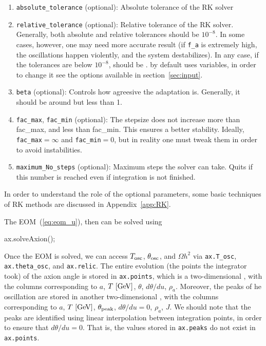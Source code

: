 \documentclass[11pt,a4paper]{article}
\begin{document}
\begin{enumerate}
	\item {\tt absolute\_tolerance} (optional): Absolute tolerance of the RK solver
	
	\item {\tt relative\_tolerance} (optional): Relative tolerance of the RK solver.
	Generally, both absolute and relative tolerances should be $10^{-8}$. 
	In some cases, however, one may need more accurate result (\eg if {\tt f\_a} is extremely high, 
	the oscillations happen violently, and the system destabilizes). In any case, if the  
	tolerances are below $10^{-8}$,  should be . \mimes by default uses  variables, 
	in order to change it see the options available in section~\ref{sec:input}.
	
	\item {\tt beta} (optional): Controls how agreesive the adaptation is. Generally, it should be around but less than 1.
	
	\item {\tt fac\_max},  {\tt fac\_min} (optional): The stepsize does not increase more than fac\_max, and less than fac\_min. 
	This ensures a better stability. Ideally, {\tt fac\_max}$=\infty$ and {\tt fac\_min}$=0$, but in reality one must 
	tweak them in order to avoid instabilities.
	
	\item {\tt maximum\_No\_steps} (optional): Maximum steps the solver can take. Quits if this number is reached even if integration
	is not finished. 
\end{enumerate}
%
In order to understand the role of the optional parameters, some basic techniques of RK methods are discussed in Appendix~\ref{app:RK}. 

The EOM~(\ref{eq:eom_u}), then can be solved using 
%
\begin{cpp}
	ax.solveAxion();
\end{cpp}
%
Once the EOM is solved, we can access $T_{\rm osc}{}$, $\theta_{\rm osc}{}$, and $\Omega h^2$  via {\tt ax.T\_osc}, {\tt ax.theta\_osc}, and {\tt ax.relic}. The entire evolution (the points the integrator took) of the axion angle is stored in {\tt ax.points}, which is a two-dimensional , with the columns corresponding to  $a$, $T~[{\rm GeV}]$, 
$\theta$, $d\theta/du$, $\rho_a$. Moreover, the peaks of he oscillation are stored in another two-dimensional , with the columns corresponding to $a$, $T~[{\rm GeV}]$, $\theta_{\rm peak}{}$, $d\theta/du=0$, $\rho_a$, $J$. We should note that the peaks are identified using linear interpolation between integration points, in order to ensure that $d\theta/du = 0$. That is, the values stored in {\tt ax.peaks} do not exist in {\tt ax.points}. 
\end{document}
